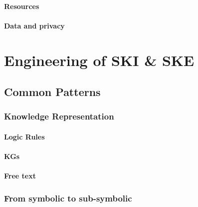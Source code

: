 \documentclass[12pt,a4paper,openright,twoside]{book}
\begin{document}
\subsection{Resources}\label{subsec:resources}

\subsection{Data and privacy}\label{subsec:data-and-privacy}


\part{Engineering of \ac{SKI} \& \ac{SKE}}\label{part:engineering-of-ski-ske}


\chapter{Common Patterns}\label{ch:common-patterns}

\section{Knowledge Representation}\label{sec:knowledge-representation}

\subsection{Logic Rules}\label{subsec:logic-rules}

\subsection{\Aclp{KG}}\label{subsec:kg}

\subsection{Free text}\label{subsec:free-text}

\section{From symbolic to sub-symbolic}\label{sec:from-symbolic-to-sub-symbolic}
\end{document}
